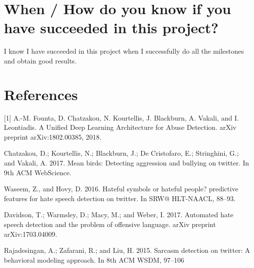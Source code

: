 \documentclass[11pt, twocolumn]{article}
\begin{document}
\section{When / How do you know if you have succeeded in this project?}

I know I have succeeded in this project when I successfully do all the milestones and obtain good results.

\section{References}

[1] A.-M. Founta, D. Chatzakou, N. Kourtellis, J. Blackburn, A. Vakali, and I. Leontiadis. A Unified Deep Learning Architecture for Abuse Detection. arXiv preprint arXiv:1802.00385, 2018.
\newline	

\noindent
[2] Chatzakou, D.; Kourtellis, N.; Blackburn, J.; De Cristofaro, E.; Stringhini, G.; and Vakali, A. 2017. Mean birds: Detecting aggression and bullying on twitter. In 9th ACM WebScience.
\newline

\noindent
[3] Waseem, Z., and Hovy, D. 2016. Hateful symbols or hateful people? predictive features for hate speech detection on twitter. In SRW@ HLT-NAACL, 88–93.
\newline

\noindent
[4] Davidson, T.; Warmsley, D.; Macy, M.; and Weber, I. 2017. Automated hate speech detection and the problem of offensive language. arXiv preprint arXiv:1703.04009.
\newline

\noindent
[5] Rajadesingan, A.; Zafarani, R.; and Liu, H. 2015. Sarcasm detection on twitter: A behavioral modeling approach. In 8th ACM WSDM, 97–106

%
\end{document}
